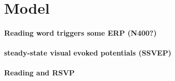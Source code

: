 \section{Model}


\paragraph{Reading word triggers some ERP (N400?)} \cite{}

\paragraph{\bf steady-state visual evoked potentials (SSVEP)}

\paragraph{Reading and RSVP}
